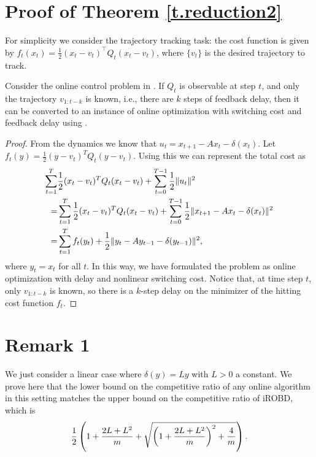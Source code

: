 \section{Proof of Theorem \ref{t.reduction2}}\label{appendix.reudction2}
For simplicity we consider the trajectory tracking task: the cost function is given by $f_t(x_t)=\frac{1}{2}(x_t-v_t)^\top Q_t(x_t-v_t)$, where $\{v_t\}$ is the desired trajectory to track.

\begin{theorem*}
Consider the online control problem in . If $Q_t$ is observable at step $t$, and only the trajectory $v_{1:t-k}$ is known, i.e., there are $k$ steps of feedback delay, then it can be converted to an instance of online optimization with switching cost and feedback delay using .
\end{theorem*}
\begin{proof}

From the dynamics we know that $u_t=x_{t+1}-Ax_t-\delta(x_t).$ Let $f_t(y)=\frac{1}{2}(y-v_t)^TQ_t(y-v_t)$. Using this we can represent the total cost as
\begin{align}
    \sum_{t=1}^T&\frac{1}{2}(x_t-v_t)^TQ_t(x_t-v_t)+\sum_{t=0}^{T-1}\frac{1}{2}\|u_t\|^2\notag\\
    =&\sum_{t=1}^T\frac{1}{2}(x_t-v_t)^TQ_t(x_t-v_t)+\sum_{t=0}^{T-1}\frac{1}{2}\|x_{t+1}-Ax_t-\delta(x_t)\|^2\notag\\
    =&\sum_{t=1}^Tf_t(y_t)+\frac{1}{2}\|y_t-Ay_{t-1}-\delta(y_{t-1})\|^2,\notag
\end{align}
where $y_t=x_t$ for all $t$. In this way, we have formulated the problem as online optimization with delay and nonlinear switching cost. Notice that, at time step $t$, only $v_{1:t-k}$ is known, so there is a $k$-step delay on the minimizer of the hitting cost function $f_t$.

\end{proof}


\section{Remark 1}\label{appendix.remark1}

We just consider a linear case where $\delta(y)=Ly$ with $L>0$ a constant. We prove here that the lower bound on the competitive ratio of any online algorithm in this setting matches the upper bound on the competitive ratio of iROBD, which is
\begin{align}
    \frac{1}{2}\left(1+\frac{2L+L^2}{m}+\sqrt{\left(1+\frac{2L+L^2}{m}\right)^2+\frac{4}{m}}\right).\notag
\end{align}


